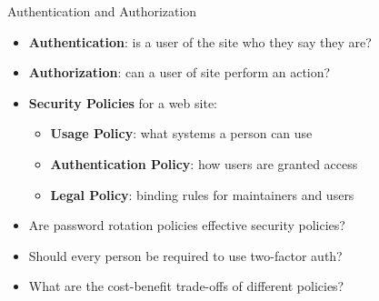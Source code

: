 \documentclass[14pt,aspectratio=169]{beamer}
\begin{document}
%
\begin{frame}{Authentication and Authorization}
  \begin{itemize}
    \item {\bf Authentication}: is a user of the site who they say they are?
      \vspace*{-.4in}
    \item {\bf Authorization}: can a user of site perform an action?
      \vspace*{-.15in}
    \item {\bf Security Policies} for a web site:
      \begin{itemize}
        \item {\bf Usage Policy}: what systems a person can use
        \item {\bf Authentication Policy}: how users are granted access
        \item {\bf Legal Policy}: binding rules for maintainers and users
      \end{itemize}
      \vspace*{-.2in}
    \item Are password rotation policies effective security policies?
      \vspace*{-.2in}
    \item Should every person be required to use two-factor auth?
      \vspace*{-.2in}
    \item What are the cost-benefit trade-offs of different policies?
  \end{itemize}
\end{frame}
\end{document}
